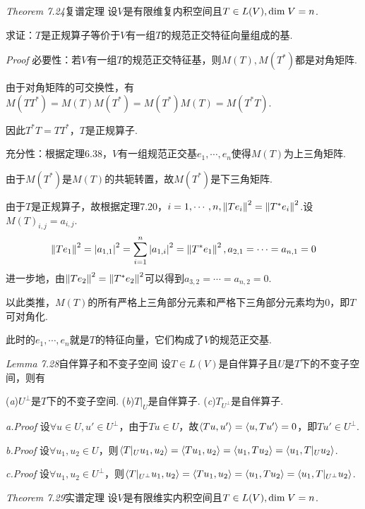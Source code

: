 \textit{Theorem 7.24}{\kaishu 复谱定理}
设\(V\)是有限维复内积空间且\(T \in L(V),\mathrm{dim \;} V=n\).

求证：\(T\)是正规算子等价于\(V\)有一组\(T\)的规范正交特征向量组成的基.

\textit{Proof}
必要性：若\(V\)有一组\(T\)的规范正交特征基，则\(M(T),M(T^*)\)都是对角矩阵.

由于对角矩阵的可交换性，有\(M(TT^*)=M(T)M(T^*)=M(T^*)M(T)=M(T^*T)\).

因此\(T^*T=TT^*\)，\(T\)是正规算子.

充分性：根据定理6.38，\(V\)有一组规范正交基\(e_1,\cdots,e_n\)使得\(M(T)\)为上三角矩阵.

由于\(M(T^*)\)是\(M(T)\)的共轭转置，故\(M(T^*)\)是下三角矩阵.

由于\(T\)是正规算子，故根据定理7.20，\(i=1,\cdots,n,\left\lVert Te_i \right\rVert^2=\left\lVert T^*e_i \right\rVert^2\).设\(M(T)_{i,j}=a_{i,j}\).
    \begin{align*}
        \left\lVert Te_1 \right\rVert^2=\left\lvert a_{1,1} \right\rvert^2=\sum_{i=1}^n \left\lvert a_{1,i} \right\rvert^2=\left\lVert T^*e_1 \right\rVert^2,a_{2,1}=\cdots=a_{n,1}=0
    \end{align*}
进一步地，由\(\left\lVert Te_2 \right\rVert^2=\left\lVert T^*e_2 \right\rVert^2\)可以得到\(a_{3,2}=\cdots=a_{n,2}=0\).

以此类推，\(M(T)\)的所有严格上三角部分元素和严格下三角部分元素均为\(0\)，即\(T\)可对角化.

此时的\(e_1,\cdots,e_n\)就是\(T\)的特征向量，它们构成了\(V\)的规范正交基.

\hspace*{\fill}

\textit{Lemma 7.28}{\kaishu 自伴算子和不变子空间}
设\(T \in L(V)\)是自伴算子且\(U\)是\(T\)下的不变子空间，则有

(\textit{a})\(U^\bot\)是\(T\)下的不变子空间. \quad
(\textit{b})\(T|_U\)是自伴算子. \quad
(\textit{c})\(T_{U^\bot}\)是自伴算子.

\textit{a.Proof}
设\(\forall u \in U,u' \in U^\bot\)，由于\(Tu \in U\)，故\(\left\langle Tu,u' \right\rangle=\left\langle u,Tu' \right\rangle=0\)，即\(Tu' \in U^\bot\).

\textit{b.Proof}
设\(\forall u_1,u_2 \in U\)，则\(\left\langle T|_U u_1,u_2 \right\rangle=\left\langle Tu_1,u_2 \right\rangle=\left\langle u_1,Tu_2 \right\rangle=\left\langle u_1,T|_U u_2 \right\rangle\).

\textit{c.Proof}
设\(\forall u_1,u_2 \in U^\bot\)，则\(\left\langle T|_{U^\bot}u_1,u_2 \right\rangle=\left\langle Tu_1,u_2 \right\rangle=\left\langle u_1,Tu_2 \right\rangle=\left\langle u_1,T|_{U^\bot}u_2 \right\rangle\).

\hspace*{\fill}

\textit{Theorem 7.29}{\kaishu 实谱定理}
设\(V\)是有限维实内积空间且\(T \in L(V),\mathrm{dim \;} V=n\).

